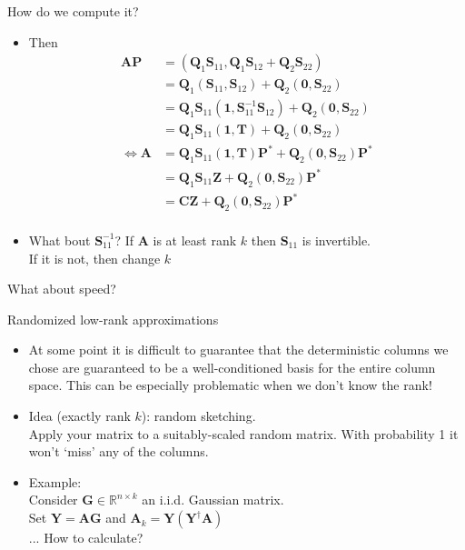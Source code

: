 \documentclass{beamer}
\newcommand{\bgk}[1]{\boldsymbol{#1}}
\newcommand{\bzero}{\bgk{0}}
\newcommand{\bone}{\bgk{1}}
\newcommand{\bvec}[1]{\mathbf{#1}}
\newcommand{\vA}{\bvec{A}}
\newcommand{\vC}{\bvec{C}}
\newcommand{\vG}{\bvec{G}}
\newcommand{\vP}{\bvec{P}}
\newcommand{\vQ}{\bvec{Q}}
\newcommand{\vS}{\bvec{S}}
\newcommand{\vT}{\bvec{T}}
\newcommand{\vY}{\bvec{Y}}
\newcommand{\vZ}{\bvec{Z}}
\newcommand{\bitem}{\item[$\bullet$]}
\begin{document}
\begin{frame}{How do we compute it?}

\begin{itemize}
    \bitem Then 
    \begin{align*}
    \vA \vP 
    &= 
    (\vQ_1\vS_{11}, \vQ_1\vS_{12} + \vQ_2\vS_{22})\\
    &=\vQ_1 (\vS_{11}, \vS_{12}) + \vQ_2 (\bzero, \vS_{22})\\
    &=\vQ_1 \vS_{11} (\bone, \vS_{11}^{-1}\vS_{12}) + \vQ_2 (\bzero, \vS_{22})\\
    &=\vQ_1 \vS_{11} (\bone, \vT) + \vQ_2 (\bzero, \vS_{22})\\
    \Leftrightarrow
    \vA
    &=
    \vQ_1 \vS_{11} (\bone, \vT)\vP^* + \vQ_2 (\bzero, \vS_{22})\vP^*\\
    &=
    \vQ_1 \vS_{11} \vZ + \vQ_2 (\bzero, \vS_{22})\vP^*\\
    &=
    \vC \vZ + \vQ_2 (\bzero, \vS_{22})\vP^*\\
    \end{align*}
    \bitem What bout $\vS_{11}^{-1}$? If $\vA$ is at least rank $k$ then $\vS_{11}$ is invertible.\\ 
    If it is not, then change $k$
\end{itemize}
\end{frame}

\begin{frame}{What about speed?\\
\begin{small}
Randomized low-rank approximations
\end{small}
}

\begin{itemize}
    \bitem At some point it is difficult to guarantee that the deterministic columns we chose are guaranteed to be a well-conditioned basis for the entire column space. This can be especially problematic when we don't know the rank!
    \bitem Idea (exactly rank $k$): random sketching.\\ 
    Apply your matrix to a suitably-scaled random matrix. 
    With probability 1 it won't `miss' any of the columns.
    \bitem Example:\\ 
    Consider $\vG \in \mathbb{R}^{n\times k}$ an i.i.d. Gaussian matrix. \\
    Set $\vY = \vA \vG$ and $\vA_k = \vY(\vY^\dagger \vA)$\\
    ... How to calculate?
\end{itemize}
   
\end{frame}
\end{document}
